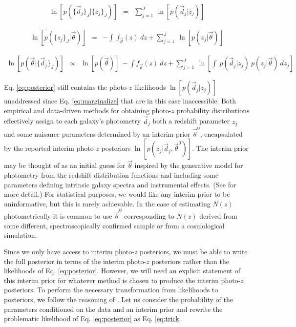 \documentclass[preprint]{aastex}
\begin{document}
\begin{eqnarray}
\label{eq:indiedat}
\ln[p(\{\vec{d}_{j}\}_{J}|\{z_{j}\}_{J})] &=& \sum_{j=1}^{J}\ 
\ln[p(\vec{d}_{j}|z_{j})]
\end{eqnarray}

\begin{eqnarray}
\label{eq:indie}
\ln[p(\{z_{j}\}_{J}|\vec{\theta})] &=& -\int\ f_{\vec{\theta}}(z)\ dz +  
\sum_{j=1}^{J}\ \ln[p(z_{j}|\vec{\theta})]
\end{eqnarray}

\begin{eqnarray}
\label{eq:posterior}
\ln[p(\vec{\theta}|\{\vec{d}_{j}\}_{J})] &\propto& \ln[p(\vec{\theta})]\ -\int 
f_{\vec{\theta}}(z)\ dz + \sum_{j=1}^{J}\ \ln\left[\int\ p(\vec{d}_{j}|z_{j})\ 
p(z_{j}|\vec{\theta})\ dz_{j}\right]
\end{eqnarray}

Eq. \ref{eq:posterior} still contains the photo-$z$ likelihoods 
$\ln[p(\vec{d}_{j}|z_{j})]$ unaddressed since Eq. \ref{eq:marginalize} that are 
in this case inaccessible.  Both empirical and data-driven methods for 
obtaining photo-$z$ probability distributions effectively assign to each 
galaxy's photometry $\vec{d}_{j}$ both a redshift parameter $z_{j}$ and some 
nuisance parameters determined by an interim prior $\vec{\theta}^{0}$, 
encapsulated by the reported interim photo-$z$ posteriors 
$\ln[p(z_{j}|\vec{d}_{j},\vec{\theta}^{0})]$.  The interim prior may be thought 
of as an initial guess for $\vec{\theta}$ inspired by the generative model for 
photometry from the redshift distribution functions and including some 
parameters defining intrinsic galaxy spectra and instrumental effects. (See 
\citet{Benitez2000} for more detail.)  For statistical purposes, we would like 
any interim prior to be uninformative, but this is rarely achievable.  In the 
case of estimating $N(z)$ photometrically it is common to use 
$\vec{\theta}^{0}$ corresponding to $N(z)$ derived from some different, 
spectroscopically confirmed sample or from a cosmological simulation.

Since we only have access to interim photo-$z$ posteriors, we must be able to 
write the full posterior in terms of the interim photo-$z$ posteriors rather 
than the likelihoods of Eq. \ref{eq:posterior}.  However, we will need an 
explicit statement of this interim prior for whatever method is chosen to 
produce the interim photo-$z$ posteriors.  To perform the necessary 
transformation from likelihoods to posteriors, we follow the reasoning of 
\citet{Marshall2015}.  Let us consider the probability of the parameters 
conditioned on the data and an interim prior and rewrite the problematic 
likelihood of Eq. \ref{eq:posterior} as Eq. \ref{eq:trick}.  
\end{document}

